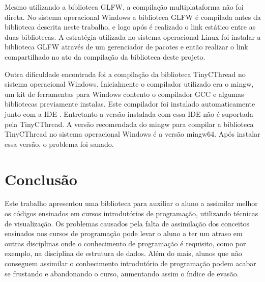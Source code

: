 \documentclass[12pt, %
openright,
oneside, %
a4paper,    %
brazil]{facom-ufu-abntex2}
\begin{document}
Mesmo utilizando a biblioteca GLFW, a compilação multiplataforma não foi direta. No sistema operacional Windows a biblioteca GLFW é compilada antes da biblioteca descrita neste trabalho, e logo após é realizado o link estático entre as duas bibliotecas. A estratégia utilizada no sistema operacional Linux foi instalar a biblioteca GLFW através de um gerenciador de pacotes e então realizar o link compartilhado no ato da compilação da biblioteca deste projeto.

Outra dificuldade encontrada foi a compilação da biblioteca TinyCThread no sistema operacional Windows. Inicialmente o compilador utilizado era o mingw, um kit de ferramentas para Windows contento o compilador GCC e algumas bibliotecas previamente instalas. Este compilador foi instalado automaticamente junto com a IDE . Entretanto a versão instalada com essa IDE não é suportada pela TinyCThread. A versão recomendada do mingw para compilar a biblioteca TinyCThread no sistema operacional Windows é a versão mingw64. Após instalar essa versão, o problema foi sanado.


\chapter*[Conclusão]{Conclusão}
Este trabalho apresentou uma biblioteca para auxiliar o aluno a assimilar melhor os códigos ensinados em cursos introdutórios de programação, utilizando técnicas de visualização. Os problemas causados pela falta de assimilação dos conceitos ensinados nos cursos de programação pode levar o aluno a ter um atraso em outras disciplinas onde o conhecimento de programação é requisito, como por exemplo, na disciplina de estrutura de dados. Além do mais, alunos que não conseguem assimilar o conhecimento introdutório de programação podem acabar se frustando e abandonando o curso, aumentando assim o índice de evasão.
\end{document}
